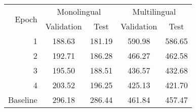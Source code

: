 \begin{tabular}{r|c|c|c|c}
     \hline
     \multirow{2}{*}{Epoch} & \multicolumn{2}{c|}{Monolingual} & \multicolumn{2}{c}{Multilingual} \\
     \cline{2-5}
     & \multicolumn{1}{c|}{Validation} & \multicolumn{1}{c|}{Test} & \multicolumn{1}{c|}{Validation} & \multicolumn{1}{c}{Test} \\
     \hline
     1 & 188.63 & 181.19 & 590.98 & 586.65 \\
     2 & 192.71 & 186.28 & 466.27 & 462.58 \\
     3 & 195.50 & 188.51 & 436.57 & 432.68 \\
     4 & 203.52 & 196.25 & 425.13 & 421.70 \\
     \hline
     Baseline & 296.18 & 286.44 & 461.84 & 457.47 \\
     \hline
\end{tabular}